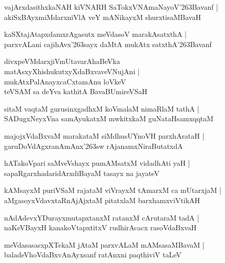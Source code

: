 \documentclass[twoside,12pt,openright]{book}
\def\S{\char'263}
\newcounter{shloka}[chapter]
\begin{document}
\begin{shloka}%
vajArxdasithxkaNAH kiVNARH SaTokxVNAmaNayoV\S Bavanf |\\
akiSxBAyxmiMdarxniVlA veY mANikayxM shurxtisaMBavaH
\end{shloka}

\begin{shloka}%
kaSXtajAtapxdamxrAgasutx meVdasoV marakAsatxthA |\\
parxvALani cajihAvx\S sayx daMtA mukAtx satxthA\S Bavanf 
\end{shloka}

\begin{shloka}%
divxpeVMdarxjiVmUtavarAhaBeVka \\
matAsxyXhishukutxyXdaBxvaveVNujAni |\\
mukAtxPalAnayxcaCxtamAnu loVkeV \\
teVSAM sa deYva kathitA BavaBUmireVSaH 
\end{shloka}

\begin{shloka}%
sitaM vaqtaM gurusinxgadhxM koVmalaM nimaRlaM tathA |\\
SADugxNeyxVna samAyukatxM mwkitxkaM guNataHsamxqqtaM 
\end{shloka}

\begin{shloka}%
majojxVdaBxvaM marakataM siMdhusUYnoVH parxhArataH |\\
garuDoVdAgxranAmAnx\S sw rAjanamxNiraButatxdA
\end{shloka}

\begin{shloka}%
hATakoVpari saMveVshayx pumAMsatxM vidadhAti yaH |\\
sapaRgarxhadaridArxdiBayaM tasayx na jayateV 
\end{shloka}

\begin{shloka}%
kAMsayxM puriVSaM rajataM viVrayxM tAmarxM ca mUtarxjaM |\\
aMgasoyxVdavxtaRnAjAjxtaM pitatxlaM barxhamxviVtikAH 
\end{shloka}

\begin{shloka}%
nAdAdevxYDurayxmutapxtanxM ratanxM cArutaraM tadA |\\
naKeVBayxH kanakoVtapxtitxV rudhirAcacx rasoVdaBxvaH
\end{shloka}

\begin{shloka}%
meVdasasasxpXTekaM jAtaM parxvALaM mAMsasaMBavaM |\\
baladeVhoVdaBxvAnAyxsanf ratAnxni paqthiviV taLeV 
\end{shloka}
\end{document}
